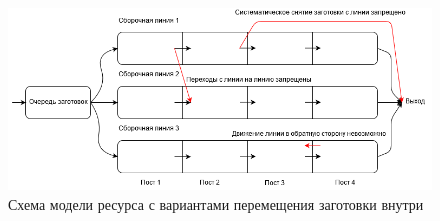 \begin{figure}[h]
	\includegraphics[width=\linewidth]{pics/assemblyMain.png}
	\caption{Схема модели ресурса с вариантами перемещения заготовки внутри}
	\label{fig:assemblyMain}
\end{figure}

